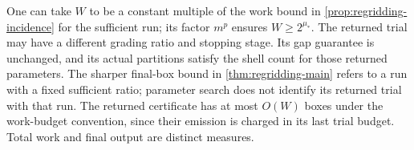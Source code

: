 One can take $W$ to be a constant multiple of the work bound in
\cref{prop:regridding-incidence} for the sufficient run; its factor
$m^p$ ensures $W\ge2^{\mu_*}$. The returned trial may have a different
grading ratio and stopping stage. Its gap guarantee is unchanged,
and its actual partitions satisfy the shell count for those returned
parameters. The sharper final-box bound in
\cref{thm:regridding-main} refers to a run with a fixed sufficient
ratio; parameter search does not identify its returned trial with
that run. The returned certificate has at most $O(W)$ boxes under
the work-budget convention, since their emission is charged in its
last trial budget. Total work and final output are distinct measures.
